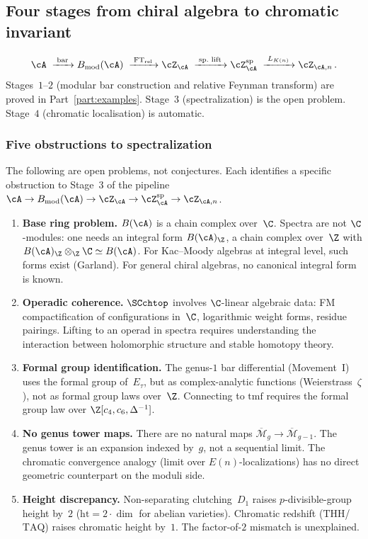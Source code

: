 \subsection{Four stages from chiral algebra to chromatic invariant}

\[
 \cA
 \;\xrightarrow{\;\mathrm{bar}\;}
 B_{\mathrm{mod}}(\cA)
 \;\xrightarrow{\;\mathrm{FT}_{\mathrm{rel}}\;}
 \cZ_\cA
 \;\xrightarrow{\;\text{sp.\ lift}\;}
 \cZ_\cA^{\mathrm{sp}}
 \;\xrightarrow{\;L_{K(n)}\;}
 \cZ_{\cA,n}\,.
\]
Stages~$1$--$2$ (modular bar construction and relative
Feynman transform) are proved in Part~\ref{part:examples}.
Stage~$3$ (spectralization) is the open problem.
Stage~$4$ (chromatic localisation) is automatic.

\subsubsection*{Five obstructions to spectralization}

The following are open problems, not conjectures. Each identifies
a specific obstruction to Stage~$3$ of the pipeline
$\cA \to B_{\mathrm{mod}}(\cA) \to \cZ_\cA \to \cZ_\cA^{\mathrm{sp}}
\to \cZ_{\cA,n}$.

\begin{enumerate}[label=\textup{(\roman*)}]
\item \textbf{Base ring problem.}
 $B(\cA)$ is a chain complex over~$\C$. Spectra are not
 $\C$-modules: one needs an integral form $B(\cA)_\Z$, a chain
 complex over~$\Z$ with $B(\cA)_\Z \otimes_\Z \C \simeq B(\cA)$.
 For Kac--Moody algebras at integral level, such forms exist
 (Garland). For general chiral algebras, no canonical integral
 form is known.

\item \textbf{Operadic coherence.}
 $\SCchtop$ involves $\C$-linear algebraic data: FM
 compactification of configurations in~$\C$, logarithmic weight
 forms, residue pairings. Lifting to an operad in spectra
 requires understanding the interaction between holomorphic
 structure and stable homotopy theory.

\item \textbf{Formal group identification.}
 The genus-$1$ bar differential (Movement~I) uses the formal
 group of~$E_\tau$, but as complex-analytic functions
 (Weierstrass~$\zeta$), not as formal group laws over~$\Z$.
 Connecting to $\mathrm{tmf}$ requires the formal group law
 over $\Z[c_4, c_6, \Delta^{-1}]$.

\item \textbf{No genus tower maps.}
 There are no natural maps
 $\overline{\mathcal{M}}_g \to \overline{\mathcal{M}}_{g-1}$.
 The genus tower is an expansion indexed by~$g$, not a sequential
 limit. The chromatic convergence analogy (limit over
 $E(n)$-localizations) has no direct geometric counterpart
 on the moduli side.

\item \textbf{Height discrepancy.}
 Non-separating clutching~$D_1$ raises $p$-divisible-group height
 by~$2$ ($\mathrm{ht} = 2 \cdot \dim$ for abelian varieties).
 Chromatic redshift ($\mathrm{THH}$/$\mathrm{TAQ}$) raises
 chromatic height by~$1$. The factor-of-$2$ mismatch is
 unexplained.
\end{enumerate}

